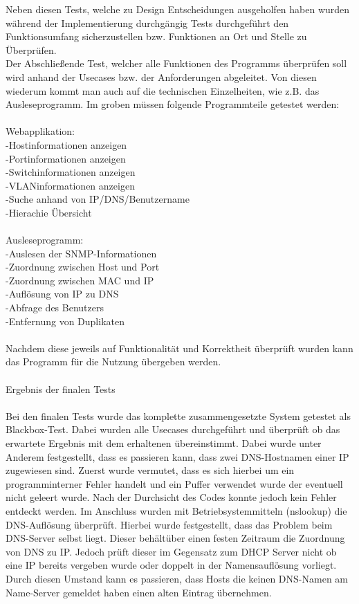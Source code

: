 Neben diesen Tests, welche zu Design Entscheidungen ausgeholfen haben wurden während der Implementierung durchgängig Tests durchgeführt den Funktionsumfang sicherzustellen bzw. Funktionen an Ort und Stelle zu Überprüfen.\\
Der Abschließende Test, welcher alle Funktionen des Programms überprüfen soll wird anhand der Usecases bzw. der Anforderungen abgeleitet. Von diesen wiederum kommt man auch auf die technischen Einzelheiten, wie z.B. das Ausleseprogramm.
Im groben müssen folgende Programmteile getestet werden:\\
\\
Webapplikation:\\
-Hostinformationen anzeigen\\
-Portinformationen anzeigen\\
-Switchinformationen anzeigen\\
-VLANinformationen anzeigen\\
-Suche anhand von IP/DNS/Benutzername\\
-Hierachie Übersicht\\
\\
Ausleseprogramm:\\
-Auslesen der SNMP-Informationen\\
-Zuordnung zwischen Host und Port \\
-Zuordnung zwischen MAC und IP\\
-Auflösung von IP zu DNS\\
-Abfrage des Benutzers\\
-Entfernung von Duplikaten\\
\\
Nachdem diese jeweils auf Funktionalität und Korrektheit überprüft wurden kann das Programm für die Nutzung übergeben werden.\\
\\
Ergebnis der finalen Tests\\
\\
Bei den finalen Tests wurde das komplette zusammengesetzte System getestet als Blackbox-Test. Dabei wurden alle Usecases durchgeführt und überprüft ob das erwartete Ergebnis mit dem erhaltenen übereinstimmt. Dabei wurde unter Anderem festgestellt, dass es passieren kann, dass zwei DNS-Hostnamen einer IP zugewiesen sind. Zuerst wurde vermutet, dass es sich hierbei um ein programminterner Fehler handelt und ein Puffer verwendet wurde der eventuell nicht geleert wurde. Nach der Durchsicht des Codes konnte jedoch kein Fehler entdeckt werden. Im Anschluss wurden mit Betriebsystemmitteln (nslookup) die DNS-Auflösung überprüft. Hierbei wurde festgestellt, dass das Problem beim DNS-Server selbst liegt. Dieser behältüber einen festen Zeitraum die Zuordnung von DNS zu IP. Jedoch prüft dieser im Gegensatz zum DHCP Server nicht ob eine IP bereits vergeben wurde oder doppelt in der Namensauflösung vorliegt. Durch diesen Umstand kann es passieren, dass Hosts die keinen DNS-Namen am Name-Server gemeldet haben einen alten Eintrag übernehmen.


